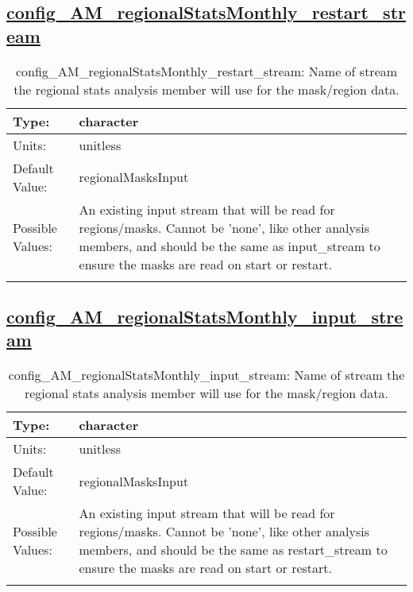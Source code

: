 \subsection[config\_AM\_regionalStatsMonthly\_restart\_stream]{\hyperref[sec:nm_tab_AM_regionalStatsMonthly]{config\_AM\_regionalStatsMonthly\_restart\_stream}}
\label{subsec:nm_sec_config_AM_regionalStatsMonthly_restart_stream}
\begin{center}
\begin{longtable}{| p{2.0in} || p{4.0in} |}
    \hline
    Type: & character \\
    \hline
    Units: & \si{unitless} \\
    \hline
    Default Value: & regionalMasksInput \\
    \hline
    Possible Values: & An existing input stream that will be read for regions/masks. Cannot be 'none', like other analysis members, and should be the same as input\_stream to ensure the masks are read on start or restart. \\
    \hline
    \caption{config\_AM\_regionalStatsMonthly\_restart\_stream: Name of stream the regional stats analysis member will use for the mask/region data.}
\end{longtable}
\end{center}
\subsection[config\_AM\_regionalStatsMonthly\_input\_stream]{\hyperref[sec:nm_tab_AM_regionalStatsMonthly]{config\_AM\_regionalStatsMonthly\_input\_stream}}
\label{subsec:nm_sec_config_AM_regionalStatsMonthly_input_stream}
\begin{center}
\begin{longtable}{| p{2.0in} || p{4.0in} |}
    \hline
    Type: & character \\
    \hline
    Units: & \si{unitless} \\
    \hline
    Default Value: & regionalMasksInput \\
    \hline
    Possible Values: & An existing input stream that will be read for regions/masks. Cannot be 'none', like other analysis members, and should be the same as restart\_stream to ensure the masks are read on start or restart. \\
    \hline
    \caption{config\_AM\_regionalStatsMonthly\_input\_stream: Name of stream the regional stats analysis member will use for the mask/region data.}
\end{longtable}
\end{center}
